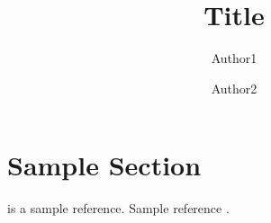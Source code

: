 \documentclass[preprint,nocopyrightspace]{sig-alternate}
\begin{document}
%

\title{Title}

\author{Author1}
\author{Author2}


\maketitle

\begin{abstract}


\end{abstract}

\section{Sample Section}
\citet{DBLP:conf/sc/Rubio-GonzalezNNDKSBIH13} is a sample reference.
Sample reference \cite{DBLP:conf/sc/Rubio-GonzalezNNDKSBIH13}.


\end{document}
